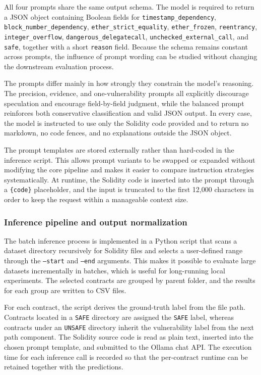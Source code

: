 \documentclass[a4paper,11pt]{article}\usepackage{graphicx} %
\begin{document}
All four prompts share the same output schema. The model is required to return a JSON object containing Boolean fields for \texttt{timestamp\_dependency}, \texttt{block\_number\_dependency}, \texttt{ether\_strict\_equality}, \texttt{ether\_frozen}, \texttt{reentrancy}, \texttt{integer\_overflow}, \texttt{dangerous\_delegatecall}, \texttt{unchecked\_external\_call}, and \texttt{safe}, together with a short \texttt{reason} field. Because the schema remains constant across prompts, the influence of prompt wording can be studied without changing the downstream evaluation process.

The prompts differ mainly in how strongly they constrain the model's reasoning. The precision, evidence, and one-vulnerability prompts all explicitly discourage speculation and encourage field-by-field judgment, while the balanced prompt reinforces both conservative classification and valid JSON output. In every case, the model is instructed to use only the Solidity code provided and to return no markdown, no code fences, and no explanations outside the JSON object.

The prompt templates are stored externally rather than hard-coded in the inference script. This allows prompt variants to be swapped or expanded without modifying the core pipeline and makes it easier to compare instruction strategies systematically. At runtime, the Solidity code is inserted into the prompt through a \texttt{\{code\}} placeholder, and the input is truncated to the first 12{,}000 characters in order to keep the request within a manageable context size.

\subsubsection{Inference pipeline and output normalization}

The batch inference process is implemented in a Python script that scans a dataset directory recursively for Solidity files and selects a user-defined range through the \texttt{--start} and \texttt{--end} arguments. This makes it possible to evaluate large datasets incrementally in batches, which is useful for long-running local experiments. The selected contracts are grouped by parent folder, and the results for each group are written to CSV files.

For each contract, the script derives the ground-truth label from the file path. Contracts located in a \texttt{SAFE} directory are assigned the \texttt{SAFE} label, whereas contracts under an \texttt{UNSAFE} directory inherit the vulnerability label from the next path component. The Solidity source code is read as plain text, inserted into the chosen prompt template, and submitted to the Ollama chat API. The execution time for each inference call is recorded so that the per-contract runtime can be retained together with the predictions.
\end{document}
